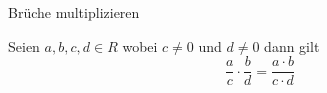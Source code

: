 %


\begin{theorem}{Brüche multiplizieren}
    \leanok

Seien $a,b,c,d \in R$ wobei $c \neq 0$ und $d \neq 0$ dann gilt
$$
\frac{a}{c} \cdot \frac{b}{d} = \frac{a \cdot b}{c \cdot d}
$$

\end{theorem}
    

%
